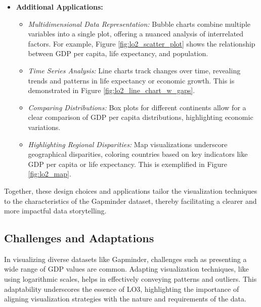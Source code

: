 \begin{itemize}
    \item \textbf{Additional Applications:}
\begin{itemize}
    \item \textit{Multidimensional Data Representation:} Bubble charts combine multiple variables into a single plot, offering a nuanced analysis of interrelated factors. For example, Figure \ref{fig:lo2_scatter_plot} shows the relationship between GDP per capita, life expectancy, and population.
    \item \textit{Time Series Analysis:} Line charts track changes over time, revealing trends and patterns in life expectancy or economic growth. This is demonstrated in Figure \ref{fig:lo2_line_chart_w_gaps}.
    \item \textit{Comparing Distributions:} Box plots for different continents allow for a clear comparison of GDP per capita distributions, highlighting economic variations.
    \item \textit{Highlighting Regional Disparities:} Map visualizations underscore geographical disparities, coloring countries based on key indicators like GDP per capita or life expectancy. This is exemplified in Figure \ref{fig:lo2_map}.
\end{itemize}
\end{itemize}

Together, these design choices and applications tailor the visualization techniques to the characteristics of the Gapminder dataset, thereby facilitating a clearer and more impactful data storytelling.

\subsection{Challenges and Adaptations}
In visualizing diverse datasets like Gapminder, challenges such as presenting a wide range of GDP values are common. Adapting visualization techniques, like using logarithmic scales, helps in effectively conveying patterns and outliers. This adaptability underscores the essence of LO3, highlighting the importance of aligning visualization strategies with the nature and requirements of the data.